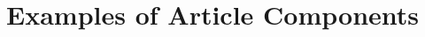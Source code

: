 \documentclass{caosp306}
\begin{document}
\date{April 7, 2017}

\maketitle

\begin{abstract}
This template can be used to prepare a proceeding for the 10\textsuperscript{th} International Workshop on Astronomical X--Ray Optics Prague
\end{abstract}

%
\section{Examples of Article Components}
\label{sec:examples}
\end{document}
